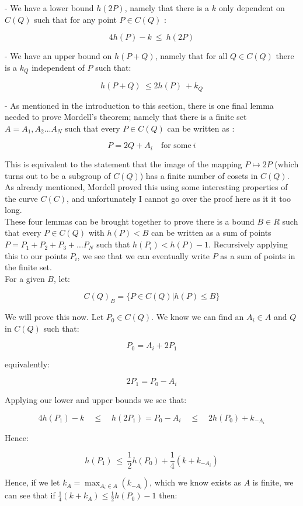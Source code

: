 \documentclass{article}
\begin{document}
- We have a lower bound $h(2P)$, namely that there is a $k$ only dependent on $C(Q)$ such that for any point $P \in C(Q)$ :

\[ 4h(P) - k \ \leq \ h(2P) \]

- We have an upper bound on $h(P + Q)$, namely that for all $Q \in C(Q)$ there is a $k_Q$ independent of $P$ such that:

\[ h(P + Q) \ \leq 2h(P) \ + k_Q \]

- As mentioned in the introduction to this section, there is one final lemma needed to prove Mordell's theorem; namely that there is a finite set $A = {A_1, A_2 ... A_N}$ such that every $P \in C(Q)$ can be written as :

\[ P = 2Q + A_i \quad \text{for some} \ i \]

This is equivalent to the statement that the image of the mapping $P \mapsto 2P$ (which turns out to be a subgroup of $C(Q)$) has a finite number of cosets in $C(Q)$. As already mentioned, Mordell proved this using some interesting properties of the curve $C(C)$, and unfortunately I cannot go over the proof here as it it too long.\\

These four lemmas can be brought together to prove there is a bound $B \in R$ such that every $P \in C(Q)$ with $h(P) < B$ can be written as a sum of points $P = P_1 + P_2 + P_3 + \dots P_N$ such that $h(P_i) < h(P) - 1$. Recursively applying this to our points $P_i$, we see that we can eventually write $P$ as a sum of points in the finite set.\\

For a given $B$, let:

\[ C(Q)_B = \{P \in C(Q) | h(P) \leq B\} \]

We will prove this now. Let $P_0 \in C(Q)$. We know we can find an $A_i \in A$ and $Q$ in $C(Q)$ such that:

\[P_0 = A_i + 2P_1 \]

equivalently:

\[ 2P_1 = P_0 - A_i \]

Applying our lower and upper bounds we see that:

\[ 4h(P_1) - k \quad \leq \quad  h(2P_1) =  P_0 - A_i  \quad  \leq  \quad  2h(P_0) + k_{-A_i} \]

Hence:

\[ h(P_1) \ \leq \ \frac{1}{2}h(P_0) + \frac{1}{4} (k + k_{-A_i}) \]

Hence, if we let $k_A = \max_{A_i \in A}(k_{-A_i})$, which we know exists as $A$ is finite, we can see that if $\frac{1}{4}(k + k_A) \leq \frac{1}{2}h(P_0) - 1$ then:
\end{document}
